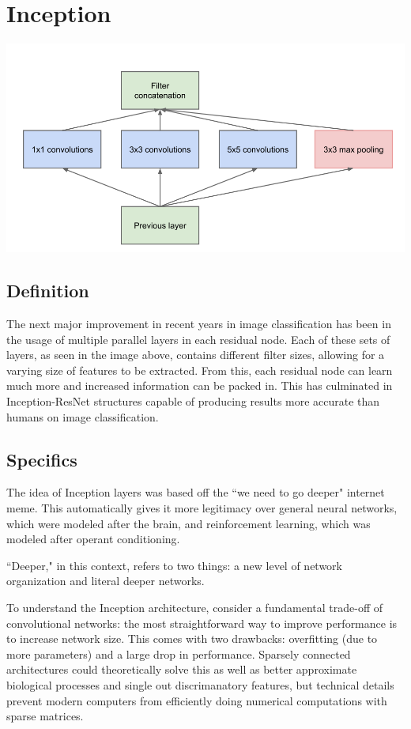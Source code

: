 \documentclass{article}
\begin{document}
\section{Inception}
\begin{center}
\includegraphics[scale=0.5]{inception}
\end{center}
\subsection{Definition}
The next major improvement in recent years in image classification has been in the usage of multiple parallel layers in each residual node. Each of these sets of layers, as seen in the image above, contains different filter sizes, allowing for a varying size of features to be extracted. From this, each residual node can learn much more and increased information can be packed in. This has culminated in Inception-ResNet structures capable of producing results more accurate than humans on image classification.

\subsection{Specifics}
    The idea of Inception layers was based off the ``we need to go deeper" internet meme. This automatically gives it more legitimacy over general neural networks, which were modeled after the brain, and reinforcement learning, which was modeled after operant conditioning.
    
    ``Deeper," in this context, refers to two things: a new level of network organization and literal deeper networks. 
    
    To understand the Inception architecture, consider a fundamental trade-off of convolutional networks: the most straightforward way to improve performance is to increase network size. This comes with two drawbacks: overfitting (due to more parameters) and a large drop in performance. Sparsely connected architectures could theoretically solve this as well as better approximate biological processes and single out discrimanatory features, but technical details prevent modern computers from efficiently doing numerical computations with sparse matrices.
    
\end{document}
